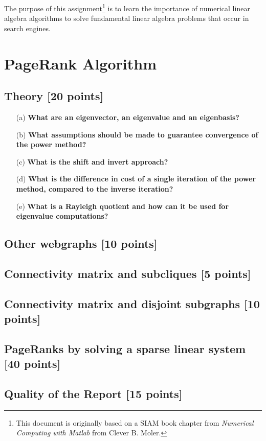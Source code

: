 \documentclass[unicode,11pt,a4paper,oneside,numbers=endperiod,openany]{scrartcl}
\begin{document}
\setassignment
{}

\newline

\assignmentpolicy
The purpose of this assignment\footnote{This document is originally based on a SIAM book chapter from \textsl{Numerical Computing with Matlab} from  Clever B. Moler.} is to learn the importance of numerical linear algebra algorithms to solve fundamental  linear algebra problems that occur in search engines.



\section*{PageRank Algorithm }

\subsection{Theory [20 points]}

\begin{enumerate}
\item[(a)] \textbf{What are an eigenvector, an eigenvalue and an eigenbasis?}
\item[(b)] \textbf{What assumptions should be made to guarantee convergence of the power method?}
\item[(c)] \textbf{What is the shift and invert approach?}
\item[(d)] \textbf{What is the difference in cost of a single iteration of the power method, compared to the inverse iteration?}
\item[(e)] \textbf{What is a Rayleigh quotient and how can it be used for eigenvalue computations?}
\end{enumerate}

\subsection{Other webgraphs [10 points]}

\subsection{Connectivity matrix and subcliques [5 points]}

\subsection{Connectivity matrix and disjoint subgraphs [10 points]}

\subsection{PageRanks by solving a sparse linear system [40 points]}

\subsection{Quality of the Report [15 points]}
\end{document}
